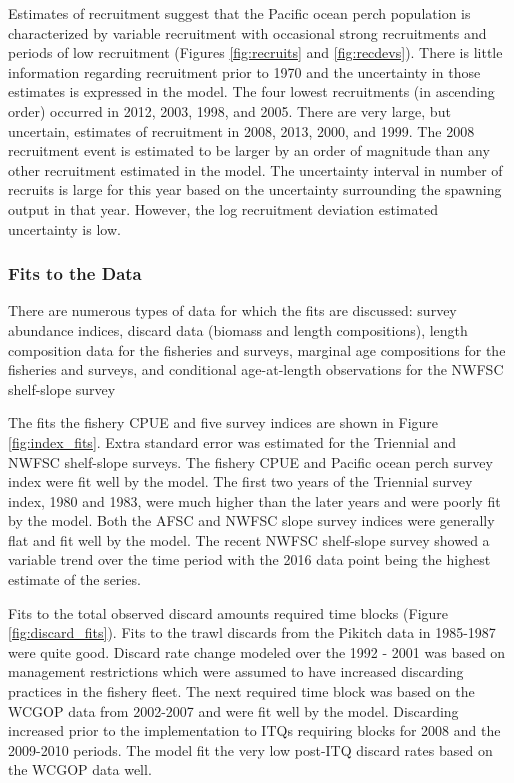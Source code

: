 \documentclass[12pt,]{article}
\begin{document}
Estimates of recruitment suggest that the Pacific ocean perch population
is characterized by variable recruitment with occasional strong
recruitments and periods of low recruitment (Figures \ref{fig:recruits}
and \ref{fig:recdevs}). There is little information regarding
recruitment prior to 1970 and the uncertainty in those estimates is
expressed in the model. The four lowest recruitments (in ascending
order) occurred in 2012, 2003, 1998, and 2005. There are very large, but
uncertain, estimates of recruitment in 2008, 2013, 2000, and 1999. The
2008 recruitment event is estimated to be larger by an order of
magnitude than any other recruitment estimated in the model. The
uncertainty interval in number of recruits is large for this year based
on the uncertainty surrounding the spawning output in that year.
However, the log recruitment deviation estimated uncertainty is low.

\subsubsection{Fits to the Data}\label{fits-to-the-data}

There are numerous types of data for which the fits are discussed:
survey abundance indices, discard data (biomass and length
compositions), length composition data for the fisheries and surveys,
marginal age compositions for the fisheries and surveys, and conditional
age-at-length observations for the NWFSC shelf-slope survey

The fits the fishery CPUE and five survey indices are shown in Figure
\ref{fig:index_fits}. Extra standard error was estimated for the
Triennial and NWFSC shelf-slope surveys. The fishery CPUE and Pacific
ocean perch survey index were fit well by the model. The first two years
of the Triennial survey index, 1980 and 1983, were much higher than the
later years and were poorly fit by the model. Both the AFSC and NWFSC
slope survey indices were generally flat and fit well by the model. The
recent NWFSC shelf-slope survey showed a variable trend over the time
period with the 2016 data point being the highest estimate of the
series.

Fits to the total observed discard amounts required time blocks (Figure
\ref{fig:discard_fits}). Fits to the trawl discards from the Pikitch
data in 1985-1987 were quite good. Discard rate change modeled over the
1992 - 2001 was based on management restrictions which were assumed to
have increased discarding practices in the fishery fleet. The next
required time block was based on the WCGOP data from 2002-2007 and were
fit well by the model. Discarding increased prior to the implementation
to ITQs requiring blocks for 2008 and the 2009-2010 periods. The model
fit the very low post-ITQ discard rates based on the WCGOP data well.
\end{document}
